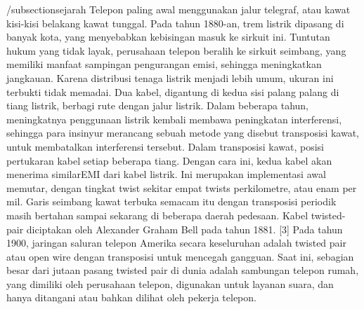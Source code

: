 /subsection{sejarah}
Telepon paling awal menggunakan jalur telegraf, atau kawat kisi-kisi belakang kawat tunggal. Pada tahun 1880-an, trem listrik dipasang di banyak kota, yang menyebabkan kebisingan masuk ke sirkuit ini. Tuntutan hukum yang tidak layak, perusahaan telepon beralih ke sirkuit seimbang, yang memiliki manfaat sampingan pengurangan emisi, sehingga meningkatkan jangkauan. Karena distribusi tenaga listrik menjadi lebih umum, ukuran ini terbukti tidak memadai. Dua kabel, digantung di kedua sisi palang palang di tiang listrik, berbagi rute dengan jalur listrik. Dalam beberapa tahun, meningkatnya penggunaan listrik kembali membawa peningkatan interferensi, sehingga para insinyur merancang sebuah metode yang disebut transposisi kawat, untuk membatalkan interferensi tersebut. Dalam transposisi kawat, posisi pertukaran kabel setiap beberapa tiang. Dengan cara ini, kedua kabel akan menerima similarEMI dari kabel listrik. Ini merupakan implementasi awal memutar, dengan tingkat twist sekitar empat twists perkilometre, atau enam per mil. Garis seimbang kawat terbuka semacam itu dengan transposisi periodik masih bertahan sampai sekarang di beberapa daerah pedesaan. Kabel twisted-pair diciptakan oleh Alexander Graham Bell pada tahun 1881. [3] Pada tahun 1900, jaringan saluran telepon Amerika secara keseluruhan adalah twisted pair atau open wire dengan transposisi untuk mencegah gangguan. Saat ini, sebagian besar dari jutaan pasang twisted pair di dunia adalah sambungan telepon rumah, yang dimiliki oleh perusahaan telepon, digunakan untuk layanan suara, dan hanya ditangani atau bahkan dilihat oleh pekerja telepon.

